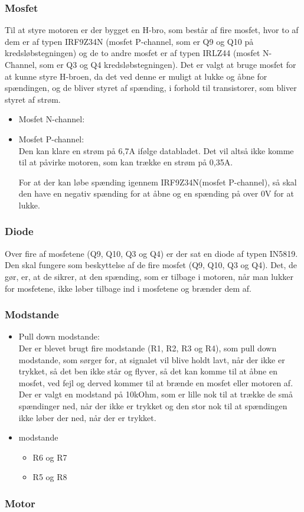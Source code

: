 \subsubsection{Mosfet}
Til at styre motoren er der bygget en H-bro, som består af fire mosfet, hvor to af dem er af typen IRF9Z34N (mosfet P-channel, som er Q9 og Q10 på kredsløbstegningen) og de to andre mosfet er af typen IRLZ44 (mosfet N-Channel, som er Q3 og Q4 kredsløbstegningen). Det er valgt at bruge mosfet for at kunne styre H-broen, da det ved denne er muligt at lukke og åbne for spændingen, og de bliver styret af spænding, i forhold til transistorer, som bliver styret af strøm. 

\begin{itemize}
	\item Mosfet N-channel:\\
	\item 
	Mosfet P-channel: \\
	Den kan klare en strøm på 6,7A ifølge databladet. Det vil altså ikke komme til at påvirke motoren, som kan trække en strøm på 0,35A. 
	
	For at der kan løbe spænding igennem IRF9Z34N(mosfet P-channel), så skal den have en negativ spænding for at åbne og en spænding på over 0V for at lukke. 
	
\end{itemize}
\subsubsection{Diode}
Over fire af mosfetene (Q9, Q10, Q3 og Q4) er der sat en diode af typen IN5819. Den skal fungere som beskyttelse af de fire mosfet (Q9, Q10, Q3 og Q4). Det, de gør, er, at de sikrer, at den spænding, som er tilbage i motoren, når man lukker for mosfetene, ikke løber tilbage ind i mosfetene og brænder dem af.

\subsubsection{Modstande}
\begin{itemize}
	\item Pull down modstande:\\
	Der er blevet brugt fire modstande (R1, R2, R3 og R4), som pull down modstande, som sørger for, at signalet vil blive holdt lavt, når der ikke er trykket, så det ben ikke står og flyver, så det kan komme til at åbne en mosfet, ved fejl og derved kommer til at brænde en mosfet eller motoren af. Der er valgt en modstand på 10kOhm, som er lille nok til at trække de små spændinger ned, når der ikke er trykket og den stor nok til at spændingen ikke løber der ned, når der er trykket.
	\item modstande
	\begin{itemize}
		\item R6 og R7
		
		\item R5 og R8
	\end{itemize}
	
	
\end{itemize}
\subsubsection{Motor}